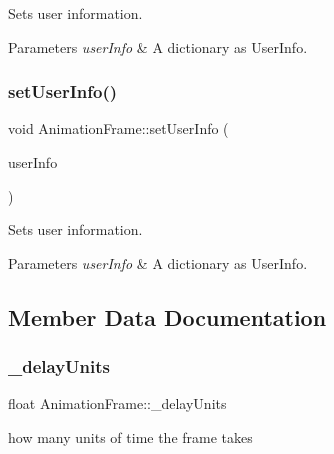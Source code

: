 Sets user information. 
\begin{DoxyParams}{Parameters}
{\em user\+Info} & A dictionary as User\+Info. \\
\hline
\end{DoxyParams}
\mbox{\label{classAnimationFrame_a5478d94008d0c0980e1618a4443f7c15}} 
\subsubsection{\texorpdfstring{set\+User\+Info()}{setUserInfo()}\hspace{0.1cm}{\footnotesize\ttfamily [2/2]}}
{\footnotesize\ttfamily void Animation\+Frame\+::set\+User\+Info (\begin{DoxyParamCaption}\item[{const Value\+Map \&}]{user\+Info }\end{DoxyParamCaption})\hspace{0.3cm}{\ttfamily [inline]}}

Sets user information. 
\begin{DoxyParams}{Parameters}
{\em user\+Info} & A dictionary as User\+Info. \\
\hline
\end{DoxyParams}


\subsection{Member Data Documentation}
\mbox{\label{classAnimationFrame_a99ce553eb8cd4befb0a5e994edb19a17}} 
\subsubsection{\texorpdfstring{\+\_\+delay\+Units}{\_delayUnits}}
{\footnotesize\ttfamily float Animation\+Frame\+::\+\_\+delay\+Units\hspace{0.3cm}{\ttfamily [protected]}}

how many units of time the frame takes \mbox{\label{classAnimationFrame_a539b2ce4748dfeae15578c3317b9faf2}} 
